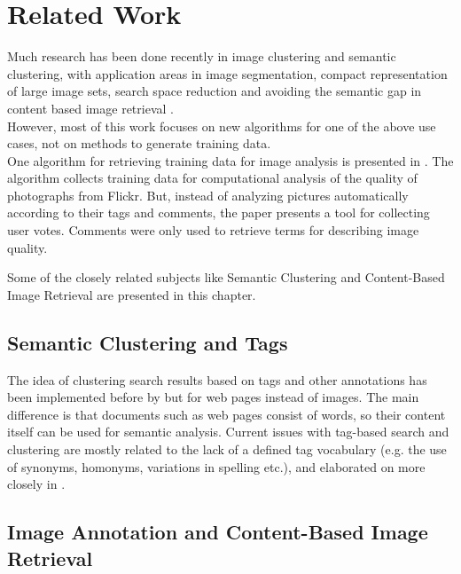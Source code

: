 \section{Related Work}
\label{sec_relatedwork}

Much research has been done recently in image clustering and semantic clustering, with application areas in image segmentation, compact representation of large image sets, search space reduction and avoiding the semantic gap in content based image retrieval \cite{Lim2011}. \\
However, most of this work focuses on new algorithms for one of the above use cases, not on methods to generate training data. \\

One algorithm for retrieving training data for image analysis is presented in \cite{Orendovici2010}. The algorithm collects training data for computational analysis of the quality of photographs from Flickr. But, instead of analyzing pictures automatically according to their tags and comments, the paper presents a tool for collecting user votes. Comments were only used to retrieve terms for describing image quality.

\bigskip

Some of the closely related subjects like Semantic Clustering and Content-Based Image Retrieval are presented in this chapter.

\subsection{Semantic Clustering and Tags}
The idea of clustering search results based on tags and other annotations has been implemented before by \cite{Ramage2009} but for web pages instead of images. The main difference is that documents such as web pages consist of words, so their content itself can be used for semantic analysis.
Current issues with tag-based search and clustering are mostly related to the lack of a defined tag vocabulary (e.g. the use of synonyms, homonyms, variations in spelling etc.), and elaborated on more closely in \cite{Auer2011}.

\subsection{Image Annotation and Content-Based Image Retrieval}

